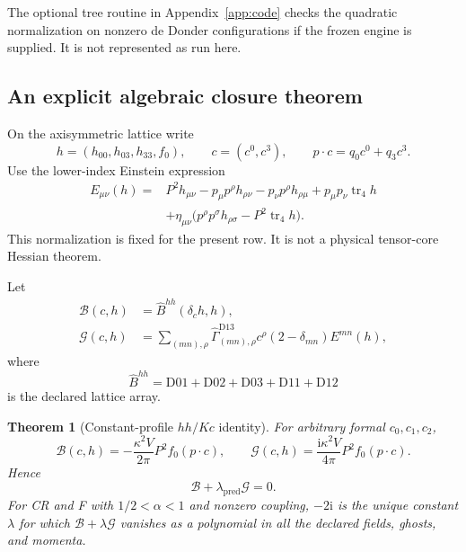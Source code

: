 \documentclass[11pt,a4paper]{article}
\newcommand{\ii}{\mathrm i}
\newcommand{\ka}{\kappa}
\theoremstyle{plain}
\newtheorem{theorem}{Theorem}[section]
\theoremstyle{definition}
\theoremstyle{remark}
\numberwithin{equation}{section}
\begin{document}
The optional tree routine in Appendix~\ref{app:code} checks the
quadratic normalization on nonzero de Donder configurations if
the frozen engine is supplied. It is not represented as run here.

\subsection{An explicit algebraic closure theorem}

On the axisymmetric lattice write
\[
 h=(h_{00},h_{03},h_{33},f_0),\qquad
 c=(c^0,c^3),\qquad
 p\cdot c=q_0c^0+q_3c^3.
\]
Use the lower-index Einstein expression
\begin{equation}
\begin{split}
 E_{\mu\nu}(h)
 ={}&P^2h_{\mu\nu}
 -p_\mu p^\rho h_{\rho\nu}
 -p_\nu p^\rho h_{\rho\mu}
 +p_\mu p_\nu\operatorname{tr}_4h\\
 &+\eta_{\mu\nu}
 \bigl(p^\rho p^\sigma h_{\rho\sigma}
                   -P^2\operatorname{tr}_4h\bigr).
\end{split}
\label{eq:Einstein}
\end{equation}
This normalization is fixed for the present row. It is not a
physical tensor-core Hessian theorem.

Let
\begin{align}
 \mathcal B(c,h)
 &=\widehat B^{hh}(\delta_ch,h),\nonumber\\
 \mathcal G(c,h)
 &=\sum_{(mn),\rho}
 \widehat\Gamma^{\mathrm{D13}}_{(mn),\rho}c^\rho
          (2-\delta_{mn})E^{mn}(h),
 \label{eq:BG}
\end{align}
where
\[
 \widehat B^{hh}
 =\mathrm{D01+D02+D03+D11+D12}
\]
is the declared lattice array.

\begin{theorem}[Constant-profile \(hh/Kc\) identity]
\label{thm:ST}
For arbitrary formal \(c_0,c_1,c_2\),
\begin{equation}
 \mathcal B(c,h)
 =-\frac{\ka^2V}{2\pi}P^2f_0(p\cdot c),
 \qquad
 \mathcal G(c,h)
 =\frac{\ii\ka^2V}{4\pi}P^2f_0(p\cdot c).
 \label{eq:BGexplicit}
\end{equation}
Hence
\begin{equation}
 \mathcal B+\lambda_{\mathrm{pred}}\mathcal G=0.
 \label{eq:ST}
\end{equation}
For CR and F with \(1/2<\alpha<1\) and nonzero coupling,
\(-2\ii\) is the unique constant \(\lambda\) for which
\(\mathcal B+\lambda\mathcal G\) vanishes as a polynomial in all
the declared fields, ghosts, and momenta.
\end{theorem}
\end{document}
